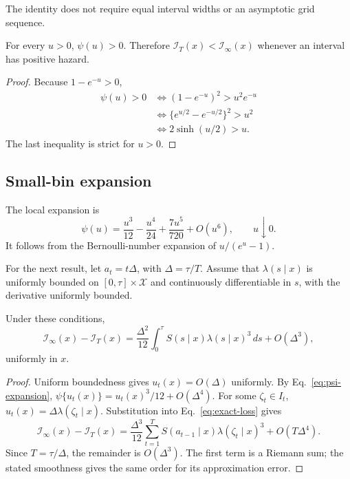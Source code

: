 \documentclass[smallextended,natbib]{svjour3}
\begin{document}
The identity does not require equal interval widths or an asymptotic grid sequence.

\begin{lemma}
\label{lem:positive}
For every $u>0$, $\psi(u)>0$. Therefore $\mathcal I_T(x)<\mathcal I_\infty(x)$ whenever an interval has positive hazard.
\end{lemma}

\begin{proof}
Because $1-e^{-u}>0$,
\begin{align}
\psi(u)>0
&\iff(1-e^{-u})^2>u^2e^{-u}\\
&\iff\{e^{u/2}-e^{-u/2}\}^2>u^2\\
&\iff 2\sinh(u/2)>u.
\end{align}
The last inequality is strict for $u>0$.
\end{proof}

\subsection{Small-bin expansion}
\label{sec:small-bin}

The local expansion is
\begin{equation}
\psi(u)=\frac{u^3}{12}-\frac{u^4}{24}+\frac{7u^5}{720}+O(u^6),
\qquad u\downarrow0.
\label{eq:psi-expansion}
\end{equation}
It follows from the Bernoulli-number expansion of $u/(e^u-1)$.

For the next result, let $a_t=t\Delta$, with $\Delta=\tau/T$. Assume that $\lambda(s\mid x)$ is uniformly bounded on $[0,\tau]\times\mathcal X$ and continuously differentiable in $s$, with the derivative uniformly bounded.

\begin{theorem}
\label{thm:small-bin}
Under these conditions,
\begin{equation}
\mathcal I_\infty(x)-\mathcal I_T(x)
=
\frac{\Delta^2}{12}
\int_0^\tau S(s\mid x)\lambda(s\mid x)^3\,ds
+O(\Delta^3),
\label{eq:small-bin-loss}
\end{equation}
uniformly in $x$.
\end{theorem}

\begin{proof}
Uniform boundedness gives $u_t(x)=O(\Delta)$ uniformly. By Eq.~\eqref{eq:psi-expansion},
$\psi\{u_t(x)\}=u_t(x)^3/12+O(\Delta^4)$. For some $\zeta_t\in I_t$,
$u_t(x)=\Delta\lambda(\zeta_t\mid x)$. Substitution into Eq.~\eqref{eq:exact-loss} gives
\begin{equation}
\mathcal I_\infty(x)-\mathcal I_T(x)
=
\frac{\Delta^3}{12}\sum_{t=1}^T
S(a_{t-1}\mid x)\lambda(\zeta_t\mid x)^3
+O(T\Delta^4).
\end{equation}
Since $T=\tau/\Delta$, the remainder is $O(\Delta^3)$. The first term is a Riemann sum; the stated smoothness gives the same order for its approximation error.
\end{proof}
\end{document}
